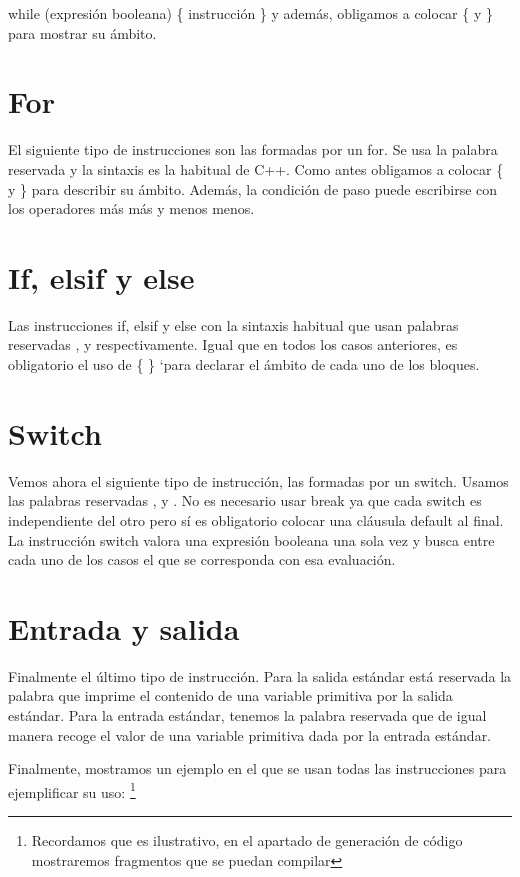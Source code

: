 while (expresión booleana) \{ instrucción \}
y además, obligamos a colocar \{ y \} para mostrar su ámbito. 

\section{For}
El siguiente tipo de instrucciones son las formadas por un for. Se usa la palabra reservada  y la sintaxis es la habitual de C++.
Como antes obligamos a colocar \{ y \} para describir su ámbito. Adem\'{a}s, la condici\'{o}n de paso puede escribirse con los operadores m\'{a}s m\'{a}s y menos menos.

	
\section{If, elsif y else}
Las instrucciones if, elsif y else con la sintaxis habitual que usan palabras reservadas ,  y 
 respectivamente. Igual que en todos los casos anteriores, es obligatorio el uso de \{ \} `para declarar el ámbito de cada uno de los bloques.

\section{Switch}
Vemos ahora el siguiente tipo de instrucción, las formadas por un switch. Usamos las palabras reservadas ,
 y . No es necesario usar break ya que cada switch es independiente del otro pero sí es obligatorio colocar una cláusula default al final. La instrucción switch valora una expresión booleana una sola vez y busca entre cada uno de los casos el que se corresponda con esa evaluación.

\section{Entrada y salida}
Finalmente el último tipo de instrucción. Para la salida estándar está reservada la palabra  que imprime el contenido de una variable primitiva por la salida estándar. Para la entrada estándar, tenemos la palabra reservada  que de igual manera recoge el valor de una variable primitiva dada por la entrada estándar.

\bigskip
Finalmente, mostramos un ejemplo en el que se usan todas las instrucciones para ejemplificar su uso: \footnote{Recordamos que es ilustrativo, en el apartado de generación de código
mostraremos fragmentos que se puedan compilar}

